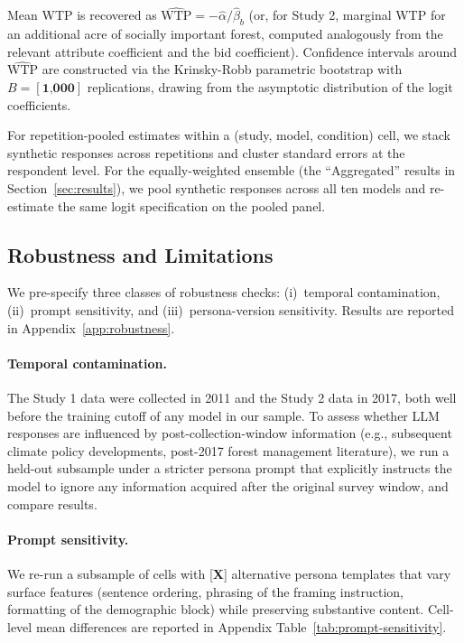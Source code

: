 \documentclass[12pt]{article}
\begin{document}
Mean WTP is recovered as $\widehat{\text{WTP}} = -\hat{\alpha}/\hat{\beta}_b$
(or, for Study 2, marginal WTP for an additional acre of socially important
forest, computed analogously from the relevant attribute coefficient and
the bid coefficient). Confidence intervals around $\widehat{\text{WTP}}$
are constructed via the Krinsky-Robb parametric bootstrap with
$B = [\textbf{1{,}000}]$ replications, drawing from the asymptotic
distribution of the logit coefficients.

For repetition-pooled estimates within a (study, model, condition) cell,
we stack synthetic responses across repetitions and cluster standard
errors at the respondent level. For the equally-weighted ensemble (the
``Aggregated'' results in Section~\ref{sec:results}), we pool synthetic
responses across all ten models and re-estimate the same logit
specification on the pooled panel.

\subsection{Robustness and Limitations}\label{sec:methods-robustness}

We pre-specify three classes of robustness checks: (i)~temporal
contamination, (ii)~prompt sensitivity, and (iii)~persona-version
sensitivity. Results are reported in Appendix~\ref{app:robustness}.

\paragraph{Temporal contamination.} The Study 1 data were collected in
2011 and the Study 2 data in 2017, both well before the training cutoff
of any model in our sample. To assess whether LLM responses are
influenced by post-collection-window information (e.g., subsequent
climate policy developments, post-2017 forest management literature), we
run a held-out subsample under a stricter persona prompt that explicitly
instructs the model to ignore any information acquired after the original
survey window, and compare results.

\paragraph{Prompt sensitivity.} We re-run a subsample of cells with
[\textbf{X}] alternative persona templates that vary surface features
(sentence ordering, phrasing of the framing instruction, formatting of
the demographic block) while preserving substantive content. Cell-level
mean differences are reported in Appendix Table~\ref{tab:prompt-sensitivity}.
\end{document}

